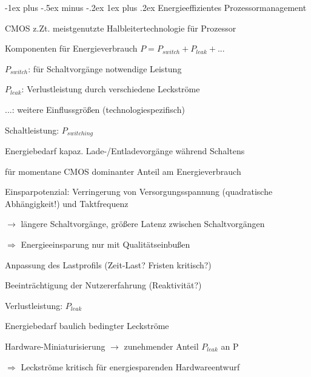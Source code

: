 \documentclass[a4paper]{article}
\makeatletter
\renewcommand{\subsubsection}{\@startsection{subsubsection}{3}{0mm}%
 {-1ex plus -.5ex minus -.2ex}%
 {1ex plus .2ex}%
 {\normalfont\small\bfseries}}
\makeatother
\begin{document}
\begin{multicols}{3}
    \subsubsection{Energieeffizientes Prozessormanagement}
    \begin{itemize*}
        \item CMOS z.Zt. meistgenutzte Halbleitertechnologie für Prozessor
        \item Komponenten für Energieverbrauch $P = P_{switch} + P_{leak} + ...$
        \begin{itemize*}
            \item $P_{switch}$: für Schaltvorgänge notwendige Leistung
            \item $P_{leak}$: Verlustleistung durch verschiedene Leckströme
            \item ...: weitere Einflussgrößen (technologiespezifisch)
        \end{itemize*}
    \end{itemize*}

    Schaltleistung: $P_{switching}$
    \begin{itemize*}
        \item Energiebedarf kapaz. Lade-/Entladevorgänge während Schaltens
        \item für momentane CMOS dominanter Anteil am Energieverbrauch
        \item Einsparpotenzial: Verringerung von Versorgungsspannung (quadratische Abhängigkeit!) und Taktfrequenz
        \item[$\rightarrow$] längere Schaltvorgänge, größere Latenz zwischen Schaltvorgängen
        \item[$\Rightarrow$] Energieeinsparung nur mit Qualitätseinbußen
        \begin{itemize*}
            \item Anpassung des Lastprofils (Zeit-Last? Fristen kritisch?)
            \item Beeinträchtigung der Nutzererfahrung (Reaktivität?)
        \end{itemize*}
    \end{itemize*}

    Verlustleistung: $P_{leak}$
    \begin{itemize*}
        \item Energiebedarf baulich bedingter Leckströme
        \item Hardware-Miniaturisierung $\rightarrow$ zunehmender Anteil $P_{leak}$ an P
        \item[$\Rightarrow$] Leckströme kritisch für energiesparenden Hardwareentwurf
    \end{itemize*}


\end{multicols}
\end{document}
